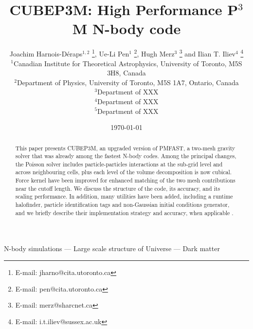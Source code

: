 \documentclass[useAMS,usenatbib]{mn2e}
\title[{\small} CUBEP3M: High Performance P$^{3}$M N-body code]{{\small} CUBEP3M: High Performance P$^{3}$M N-body code}
\author[Joachim Harnois-D\'{e}raps, Ue-Li Pen, Hugh Merz, Ilian T. Iliev]{Joachim Harnois-D\'{e}raps$^{1,2}$ 
\thanks{E-mail: jharno@cita.utoronto.ca},  Ue-Li Pen$^{1}$ \thanks{E-mail: pen@cita.utoronto.ca}, 
Hugh Merz$^{3}$ \thanks{E-mail: merz@sharcnet.ca} and  Ilian T. Iliev$^{4}$ \thanks{E-mail: i.t.iliev@sussex.ac.uk}\\
$^{1}$Canadian Institute for Theoretical Astrophysics, University of
Toronto, M5S 3H8, Canada\\
$^{2}$Department of Physics, University of Toronto, M5S 1A7, Ontario,  Canada\\
$^{3}$Department of XXX\\
$^{4}$Department of XXX\\
$^{5}$Department of XXX}
\begin{document}
\date{\today}

\pagerange{\pageref{firstpage}--\pageref{lastpage}} 

\maketitle

\label{firstpage}

\begin{abstract}
This paper presents {\small CUBEP3M}, an upgraded version of {\small PMFAST}, 
a two-mesh gravity solver that was already among the fastest N-body codes. 
Among the principal changes, the Poisson solver includes particle-particles interactions
at the sub-grid level and across neighbouring cells, plus each level of the volume decomposition is now cubical.
Force kernel have been improved for enhanced matching of the two mesh contributions near the cutoff length.
We discuss the structure of the code, its accuracy, and its scaling performance.
In addition, many utilities have been added, including a runtime halofinder,
particle identification tags and non-Gaussian initial conditions generator, and we briefly describe their implementation strategy
and accuracy, when applicable . 

\end{abstract}

\begin{keywords}
N-body simulations --- Large scale structure of Universe --- Dark matter
\end{keywords}









%

{}
%

\bsp

\label{lastpage}
\end{document}
